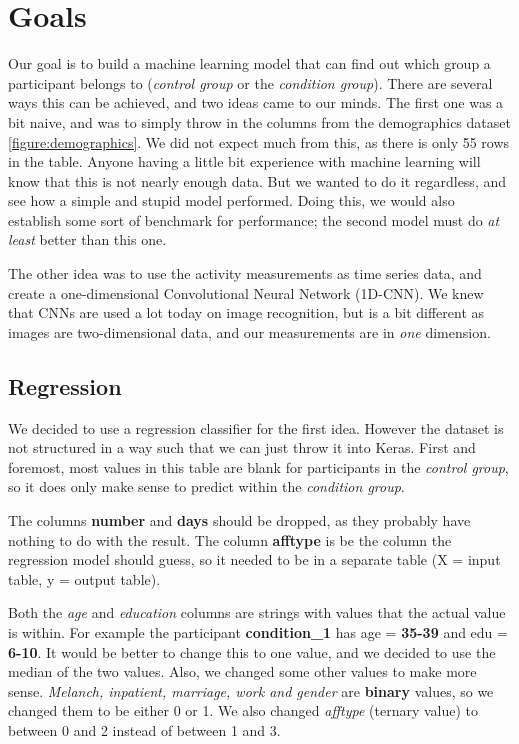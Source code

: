 \section{Goals}

Our goal is to build a machine learning model that can find out which group a participant belongs to (\textit{control group} or the \textit{condition group}).
There are several ways this can be achieved, and two ideas came to our minds. The first one was a bit naive, and was to simply throw in the columns from the 
demographics dataset \ref{figure:demographics}. We did not expect much from this, as there is only 55 rows in the table. Anyone having a little bit experience 
with machine learning will know that this is not nearly enough data. But we wanted to do it regardless, and see how a simple and stupid model performed.
Doing this, we would also establish some sort of benchmark for performance; the second model must do \textit{at least} better than this one.

The other idea was to use the activity measurements as time series data, and create a one-dimensional Convolutional Neural Network (1D-CNN). We knew that 
CNNs are used a lot today on image recognition, but is a bit different as images are two-dimensional data, and our measurements are in \textit{one} dimension.

\subsection{Regression}

We decided to use a regression classifier for the first idea. However the dataset is not structured in a way such that we can just throw it into Keras.
First and foremost, most values in this table are blank for participants in the \textit{control group}, so it does only make sense to predict within 
the \textit{condition group}. 

The columns \textbf{number} and \textbf{days} should be dropped, as they probably have nothing to do with the result. 
The column \textbf{afftype} is be the column the regression model should guess, so it needed to be in a separate table (X = input table, y = output table).

Both the \textit{age} and \textit{education} columns are strings with values that the actual value is within. For example the participant \textbf{condition\_1} 
has age = \textbf{35-39} and edu = \textbf{6-10}. It would be better to change this to one value, and we decided to use the median of the two values.
Also, we changed some other values to make more sense. \textit{Melanch, inpatient, marriage, work and gender} are \textbf{binary} values, 
so we changed them to be either 0 or 1. We also changed \textit{afftype} (ternary value) to between 0 and 2 instead of between 1 and 3.

